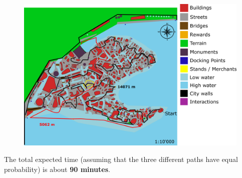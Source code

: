 \begin{itemize}
\begin{figure}[H]
    \centering
\includegraphics[scale=0.3]{Images/Diagrams/dynamiapath3.png}
\end{figure}
\end{itemize}

The total expected time (assuming that the three different paths have equal probability) is about \textbf{90 minutes}.
